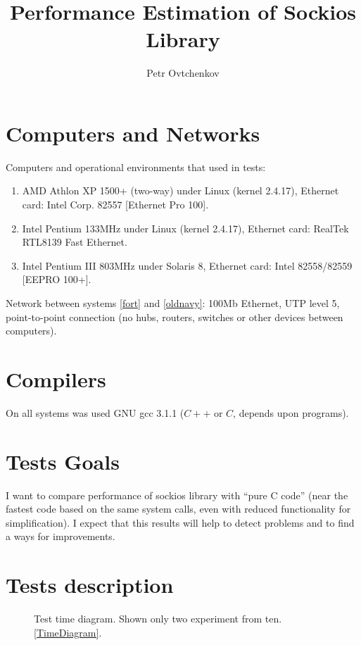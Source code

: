 \documentclass[a4paper]{article}
\title{Performance Estimation of Sockios Library}
\author{Petr Ovtchenkov}
\begin{document}
\maketitle

\section{Computers and Networks}

Computers and operational environments that used in tests:
\begin{enumerate}
  \item AMD Athlon XP 1500+ (two-way) under Linux (kernel 2.4.17),
        Ethernet card: Intel Corp. 82557 [Ethernet Pro 100].\label{fort}
  \item Intel Pentium 133MHz under Linux (kernel 2.4.17),
        Ethernet card: RealTek RTL8139 Fast Ethernet.\label{oldnavy}
  \item Intel Pentium III 803MHz under Solaris 8,
        Ethernet card: Intel 82558/82559 [EEPRO 100+].\label{ermine}
\end{enumerate}

Network between systems \ref{fort} and \ref{oldnavy}: 100Mb Ethernet,
UTP level 5, point-to-point connection (no hubs, routers,
switches or other devices between computers).

\section{Compilers}

On all systems was used GNU gcc 3{.}1{.}1 ($C{+}{+}$ or $C$, depends
upon programs).

\section{Tests Goals}

I want to compare performance of sockios library with ``pure C code''
(near the fastest code based on the same system calls, even with
reduced functionality for simplification).
I expect that this results will help to detect problems and 
to find a ways for improvements.

\section{Tests description}

\begin{figure}
  \begin{center}
    
  \end{center}
  \caption{Test time diagram. Shown only two experiment from ten.\ref{TimeDiagram}.}
\end{figure}
\end{document}
